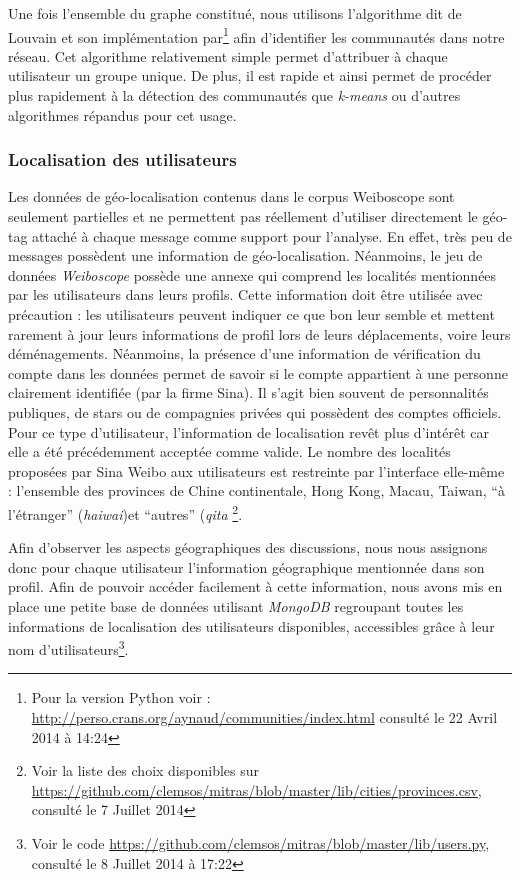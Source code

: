     Une fois l{\textquoteright}ensemble du graphe constitué, nous utilisons l{\textquoteright}algorithme dit de Louvain et son implémentation par\citep{Blondel2008}\footnote{Pour la version Python voir : \url{http://perso.crans.org/aynaud/communities/index.html} consulté le 22 Avril 2014 à 14:24} afin d'identifier les  communautés dans notre réseau. Cet algorithme relativement simple permet d'attribuer à chaque utilisateur un groupe unique. De plus, il est rapide et ainsi permet de procéder plus rapidement à la détection des communautés que \textit{k-means} ou d'autres algorithmes répandus pour cet usage.

\subsubsection[Localisation des utilisateurs]{Localisation des utilisateurs}
\label{sec:geoloc}
    Les données de géo-localisation contenus dans le corpus Weiboscope sont seulement partielles et ne permettent pas réellement d'utiliser directement le géo-tag attaché à chaque message comme support pour l'analyse. En effet, très peu de messages possèdent une information de géo-localisation. Néanmoins, le jeu de données \textit{Weiboscope} possède une annexe qui comprend les localités mentionnées par les utilisateurs dans leurs profils. Cette information doit être utilisée avec précaution : les utilisateurs peuvent indiquer ce que bon leur semble et mettent rarement à jour leurs informations de profil lors de leurs déplacements, voire leurs déménagements. Néanmoins, la présence d'une information de vérification du compte dans les données permet de savoir si le compte appartient à une personne clairement identifiée (par la firme Sina). Il s'agit bien souvent de personnalités publiques, de stars ou de compagnies privées qui possèdent des comptes officiels. Pour ce type d'utilisateur, l'information de localisation revêt plus d'intérêt car elle a été  précédemment acceptée comme valide. Le nombre des localités proposées par Sina Weibo aux utilisateurs est restreinte par l{\textquoteright}interface  elle-même : l{\textquoteright}ensemble des provinces de Chine continentale, Hong Kong, Macau, Taiwan, {\textquotedblleft}à l{\textquoteright}étranger{\textquotedblright} (\textit{haiwai})et {\textquotedblleft}autres{\textquotedblright} (\textit{qita} \footnote{Voir la liste des choix disponibles sur \url{https://github.com/clemsos/mitras/blob/master/lib/cities/provinces.csv}, consulté le 7 Juillet 2014}.

    Afin d'observer les aspects géographiques des discussions, nous nous assignons donc pour chaque utilisateur l{\textquoteright}information géographique mentionnée dans son profil. Afin de pouvoir accéder facilement à cette information, nous avons mis en place une petite base de données utilisant \textit{MongoDB} regroupant toutes les informations de localisation des utilisateurs disponibles, accessibles grâce à leur nom d'utilisateurs\footnote{Voir le code \url{https://github.com/clemsos/mitras/blob/master/lib/users.py}, consulté le 8 Juillet 2014 à 17:22}.


